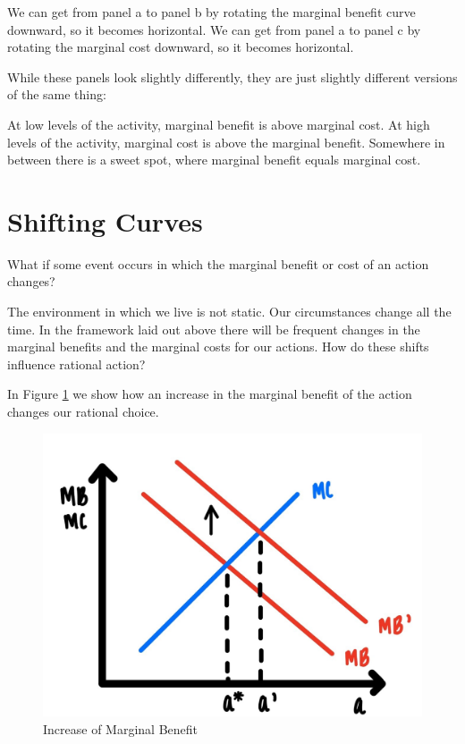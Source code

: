 \documentclass[
]{book}
\begin{document}
We can get from panel a to panel b by rotating the marginal benefit curve downward, so it becomes horizontal. We can get from panel a to panel c by rotating the marginal cost downward, so it becomes horizontal.

While these panels look slightly differently, they are just slightly different versions of the same thing:

At low levels of the activity, marginal benefit is above marginal cost. At high levels of the activity, marginal cost is above the marginal benefit. Somewhere in between there is a sweet spot, where marginal benefit equals marginal cost.

\hypertarget{shifting-curves}{%
\section{Shifting Curves}\label{shifting-curves}}

What if some event occurs in which the marginal benefit or cost of an action changes?

The environment in which we live is not static. Our circumstances change all the time. In the framework laid out above there will be frequent changes in the marginal benefits and the marginal costs for our actions. How do these shifts influence rational action?

In Figure \ref{fig:rationalchoice04} we show how an increase in the marginal benefit of the action changes our rational choice.

\begin{figure}

{\centering \includegraphics[width=0.75\linewidth]{img/rationalchoice/fig4} 

}

\caption{Increase of Marginal Benefit}\label{fig:rationalchoice04}
\end{figure}
\end{document}
